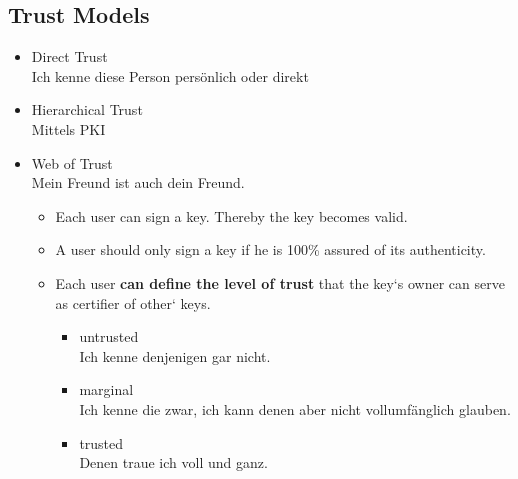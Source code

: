 \hypertarget{trust-models}{%
\subsection{Trust Models}\label{trust-models}}

\begin{itemize}
\tightlist
\item
  Direct Trust\\
  Ich kenne diese Person persönlich oder direkt
\item
  Hierarchical Trust\\
  Mittels PKI
\item
  Web of Trust \\
  Mein Freund ist auch dein Freund.\\
  \begin{itemize}
      \item
  Each user can sign a key. Thereby the key becomes valid.
\item
  A user should only sign a key if he is 100\% assured of its
  authenticity.
\item
  Each user \textbf{can define the level of trust} that the key`s owner
  can serve as certifier of other` keys.
  \begin{itemize}
  \tightlist
  \item
    untrusted\\
    Ich kenne denjenigen gar nicht.
  \item
    marginal\\
    Ich kenne die zwar, ich kann denen aber nicht vollumfänglich
    glauben.
  \item
    trusted\\
    Denen traue ich voll und ganz.
  \end{itemize}
  \end{itemize}

\end{itemize}


\clearpage